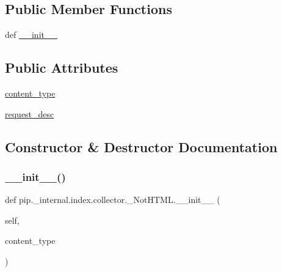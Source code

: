 \subsection*{Public Member Functions}
\begin{DoxyCompactItemize}
\item 
def \hyperlink{classpip_1_1__internal_1_1index_1_1collector_1_1__NotHTML_a32bf56c7fecc0940fc7b2203bbf8cdee}{\+\_\+\+\_\+init\+\_\+\+\_\+}
\end{DoxyCompactItemize}
\subsection*{Public Attributes}
\begin{DoxyCompactItemize}
\item 
\hyperlink{classpip_1_1__internal_1_1index_1_1collector_1_1__NotHTML_ae4df9ae09b0ebeeaf8aed7b3d00d40e8}{content\+\_\+type}
\item 
\hyperlink{classpip_1_1__internal_1_1index_1_1collector_1_1__NotHTML_add3db5a4422a3efc7506c4ea277f6bb3}{request\+\_\+desc}
\end{DoxyCompactItemize}


\subsection{Constructor \& Destructor Documentation}
\mbox{\label{classpip_1_1__internal_1_1index_1_1collector_1_1__NotHTML_a32bf56c7fecc0940fc7b2203bbf8cdee}} 
\subsubsection{\texorpdfstring{\+\_\+\+\_\+init\+\_\+\+\_\+()}{\_\_init\_\_()}}
{\footnotesize\ttfamily def pip.\+\_\+internal.\+index.\+collector.\+\_\+\+Not\+H\+T\+M\+L.\+\_\+\+\_\+init\+\_\+\+\_\+ (\begin{DoxyParamCaption}\item[{}]{self,  }\item[{}]{content\+\_\+type }\end{DoxyParamCaption})}



